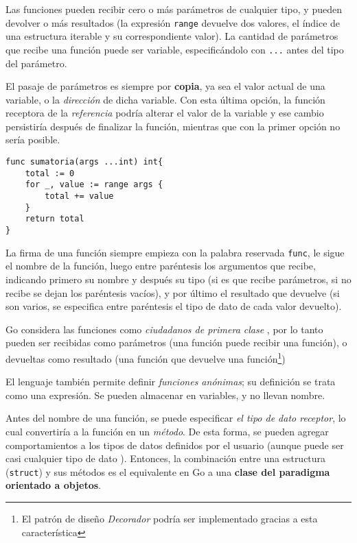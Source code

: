 Las funciones pueden recibir cero o más parámetros de cualquier tipo, y pueden devolver o más resultados (la expresión \texttt{range} devuelve dos valores, el índice de una estructura iterable y su correspondiente valor). La cantidad de parámetros que recibe una función puede ser variable, especificándolo con \texttt{...} antes del tipo del parámetro.

El pasaje de parámetros es siempre por \textbf{copia}, ya sea el valor actual de una variable, o la \emph{dirección} de dicha variable. Con esta última opción, la función receptora de la \emph{referencia} podría alterar el valor de la variable y ese cambio persistiría después de finalizar la función, mientras que con la primer opción no sería posible.  

\vspace*{5mm}
\begin{lstlisting}[title=Función con cantidad variable de argumentos]
func sumatoria(args ...int) int{
    total := 0
    for _, value := range args {
        total += value
    }
    return total
}
\end{lstlisting}

La firma de una función siempre empieza con la palabra reservada \texttt{func}, le sigue el nombre de la función, luego entre paréntesis los argumentos que recibe, indicando primero su nombre y después su tipo (si es que recibe parámetros, si no recibe se dejan los paréntesis vacíos), y por último el resultado que devuelve (si son varios, se especifica entre paréntesis el tipo de dato de cada valor devuelto). 

Go considera las funciones como \emph{ciudadanos de primera clase} \autocite{Wikipedia:first-class-citizen}, por lo tanto pueden ser recibidas como parámetros (una función puede recibir una función), o devueltas como resultado (una función que devuelve una función\footnote{El patrón de diseño \emph{Decorador} podría ser implementado gracias a esta característica}) 

El lenguaje también permite definir \emph{funciones anónimas}; su definición se trata como una expresión. Se pueden almacenar en variables, y no llevan nombre. 

Antes del nombre de una función, se puede especificar \emph{el tipo de dato receptor}, lo cual convertiría a la función en un \emph{método}. De esta forma, se pueden agregar comportamientos a los tipos de datos definidos por el usuario (aunque puede ser casi cualquier tipo de dato \autocite{TheWayToGo:Methods}). Entonces, la combinación entre una estructura (\texttt{struct}) y sus métodos es el equivalente en Go a una \textbf{clase del paradigma orientado a objetos}. 

